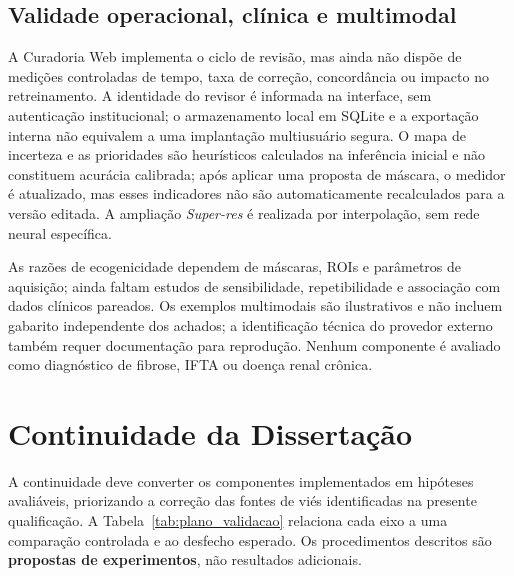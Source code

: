 \documentclass[12pt]{article}
\begin{document}
\subsection{Validade operacional, clínica e multimodal}
A Curadoria Web implementa o ciclo de revisão, mas ainda não dispõe de medições controladas de tempo, taxa de correção, concordância ou impacto no retreinamento. A identidade do revisor é informada na interface, sem autenticação institucional; o armazenamento local em SQLite e a exportação interna não equivalem a uma implantação multiusuário segura. O mapa de incerteza e as prioridades são heurísticos calculados na inferência inicial e não constituem acurácia calibrada; após aplicar uma proposta de máscara, o medidor é atualizado, mas esses indicadores não são automaticamente recalculados para a versão editada. A ampliação \emph{Super-res} é realizada por interpolação, sem rede neural específica.

As razões de ecogenicidade dependem de máscaras, ROIs e parâmetros de aquisição; ainda faltam estudos de sensibilidade, repetibilidade e associação com dados clínicos pareados. Os exemplos multimodais são ilustrativos e não incluem gabarito independente dos achados; a identificação técnica do provedor externo também requer documentação para reprodução. Nenhum componente é avaliado como diagnóstico de fibrose, IFTA ou doença renal crônica.

\section{Continuidade da Dissertação}
A continuidade deve converter os componentes implementados em hipóteses avaliáveis, priorizando a correção das fontes de viés identificadas na presente qualificação. A Tabela~\ref{tab:plano_validacao} relaciona cada eixo a uma comparação controlada e ao desfecho esperado. Os procedimentos descritos são \textbf{propostas de experimentos}, não resultados adicionais.
\end{document}
